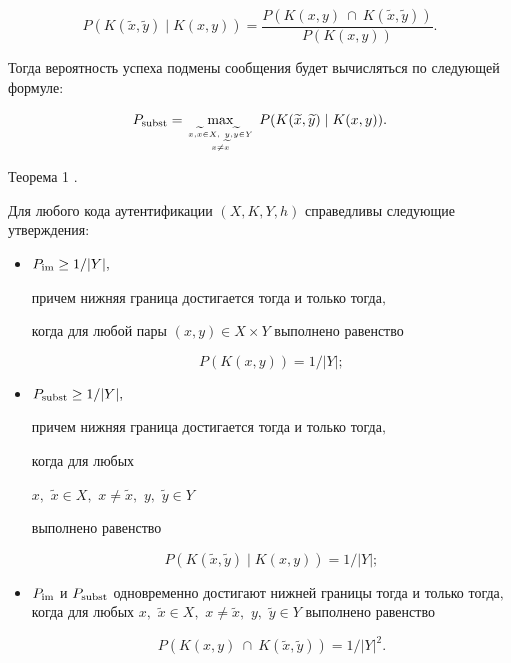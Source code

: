 $$

P(K(\widetilde{x},\widetilde{y})  \mid  K(x,y)) = \frac{P(K(x,y) ~\cap ~K(\widetilde{x},\widetilde{y}))}{P(K(x,y))}.

$$

Тогда вероятность успеха подмены сообщения будет вычисляться по следующей формуле:

$$

P_{\rm subst} = {\mathop{\max}_{x,\widetilde{x}\in X, ~y, \widetilde{y} \in Y \atop x \neq

\widetilde{x}}} ~P(K(\widetilde{x},\widetilde{y})  \mid  K(x,y)).

$$



\vskip 0.1in



{\small \sc Теорема 1 \cite{ratseev:bib:Cheremushkin}.}

{\it

Для любого кода аутентификации $(X,K,Y,h)$ справедливы следующие утверждения{\/\rm:}



\begin{itemize}

\item[$(i)$] $P_{\rm im} \geq {1}/{|Y|},$

причем нижняя граница достигается тогда и только тогда$,$

когда для любой пары $(x,y) \in X \times Y$ выполнено равенство

$$P(K(x,y)) = {1}/{|Y|};$$



\item[$(ii)$]

$P_{\rm subst} \geq {1}/{|Y|},$

причем нижняя граница достигается тогда и только тогда$,$

когда для любых

$x,$ $\widetilde{x}\in X,$ $x \neq \widetilde{x},$ $y,$ $ \widetilde{y} \in Y$

 выполнено равенство

$$P(K(\widetilde{x},\widetilde{y})  \mid  K(x,y)) = {1}/{|Y|};$$



\item[$(iii)$] $P_{\rm im}$ и $P_{\rm subst}$ одновременно достигают нижней границы тогда и только тогда$,$ когда для любых $x,$ $\widetilde{x} \in X,$ $x \neq \widetilde{x},$ $y,$ $\widetilde{y} \in Y$ выполнено равенство

$$P(K(x,y) ~\cap ~K(\widetilde{x},\widetilde{y})) = {1}/{|Y|^2}.$$





\end{itemize}



}



